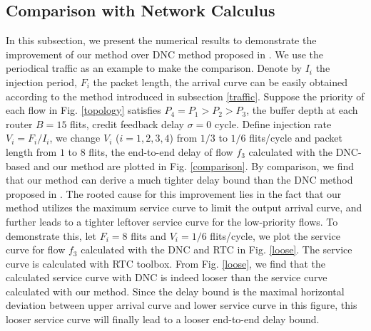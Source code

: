 \documentclass[10pt,journal]{IEEEtran}
\begin{document}
\subsection{Comparison with Network Calculus}\label{dnccmp}
In this subsection, we present the numerical results to demonstrate the improvement of our method over DNC method proposed in \cite{Qian489900}. We use the periodical traffic as an example to make the comparison. Denote by $I_i$ the injection period, $F_i$ the packet length, the arrival curve can be easily obtained according to the method introduced in subsection \ref{traffic}. Suppose the priority of each flow in Fig. \ref{topology} satisfies $P_4=P_1>P_2>P_3$, the buffer depth at each router $B=15$ flits, credit feedback delay $\sigma=0$ cycle. Define injection rate $V_i=F_i/I_i$, we change $V_i$ ($i=1,2,3,4$) from $1/3$ to $1/6$ flits/cycle and packet length from $1$ to $8$ flits, the end-to-end delay of flow $f_3$ calculated with the DNC-based and our method are plotted in Fig. \ref{comparison}. By comparison, we find that our method can derive a much tighter delay bound than the DNC method proposed in \cite{Qian489900}. The rooted cause for this improvement lies in the fact that our method utilizes the maximum service curve to limit the output arrival curve, and further leads to a tighter leftover service curve for the low-priority flows. To demonstrate this, let $F_i=8$ flits and $V_i=1/6$ flits/cycle, we plot the service curve for flow $f_3$ calculated with the DNC and RTC in Fig. \ref{loose}. The service curve is calculated with RTC toolbox. From Fig. \ref{loose}, we find that the calculated service curve with DNC is indeed looser than the service curve calculated with our method. Since the delay bound is the maximal horizontal deviation between upper arrival curve and lower service curve in this figure, this looser service curve will finally lead to a looser end-to-end delay bound.
\end{document}
